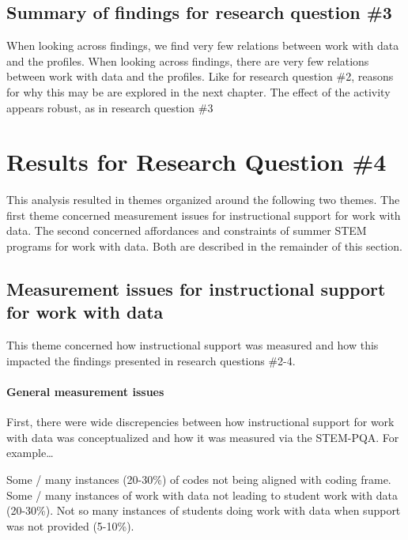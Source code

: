 \documentclass[]{msu-thesis}
\let\oldparagraph\paragraph
\renewcommand{\paragraph}[1]{\oldparagraph{#1}\mbox{}}
\theoremstyle{definition}
\theoremstyle{definition}
\theoremstyle{definition}
\theoremstyle{remark}
\begin{document}
\subsection{Summary of findings for research question
\#3}\label{summary-of-findings-for-research-question-3}

When looking across findings, we find very few relations between work
with data and the profiles. When looking across findings, there are very
few relations between work with data and the profiles. Like for research
question \#2, reasons for why this may be are explored in the next
chapter. The effect of the activity appears robust, as in research
question \#3

\section{Results for Research Question
\#4}\label{results-for-research-question-4}

This analysis resulted in themes organized around the following two
themes. The first theme concerned measurement issues for instructional
support for work with data. The second concerned affordances and
constraints of summer STEM programs for work with data. Both are
described in the remainder of this section.

\subsection{Measurement issues for instructional support for work with
data}\label{measurement-issues-for-instructional-support-for-work-with-data}

This theme concerned how instructional support was measured and how this
impacted the findings presented in research questions \#2-4.

\paragraph{General measurement issues}\label{general-measurement-issues}

First, there were wide discrepencies between how instructional support
for work with data was conceptualized and how it was measured via the
STEM-PQA. For example\ldots{}

Some / many instances (20-30\%) of codes not being aligned with coding
frame. Some / many instances of work with data not leading to student
work with data (20-30\%). Not so many instances of students doing work
with data when support was not provided (5-10\%).
\end{document}
